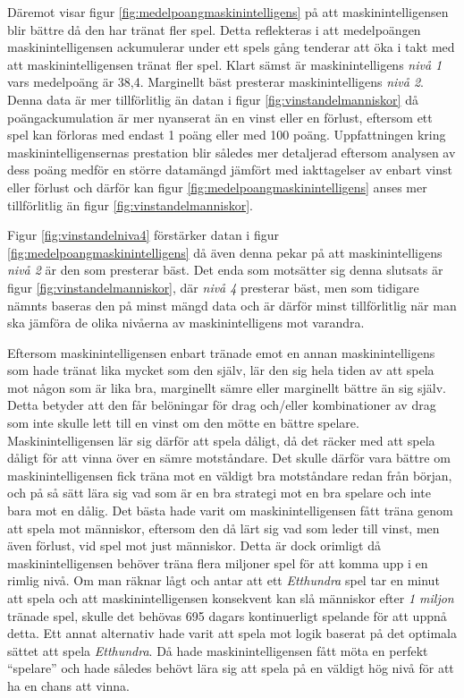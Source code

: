 \documentclass[12pt,a4paper]{article}
\begin{document}
    Däremot visar figur \ref{fig:medelpoangmaskinintelligens} på att maskinintelligensen blir bättre då den har tränat fler spel. Detta reflekteras i att medelpoängen maskinintelligensen ackumulerar under ett spels gång tenderar att öka i takt med att maskinintelligensen tränat fler spel. Klart sämst är maskinintelligens \emph{nivå 1} vars medelpoäng är 38,4. Marginellt bäst presterar maskinintelligens \emph{nivå 2}. Denna data är mer tillförlitlig än datan i figur \ref{fig:vinstandelmanniskor} då poängackumulation är mer nyanserat än en vinst eller en förlust, eftersom  ett spel kan förloras med endast 1 poäng eller med 100 poäng. Uppfattningen kring maskinintelligensernas prestation blir således mer detaljerad eftersom analysen av dess poäng medför en större datamängd jämfört med iakttagelser av enbart vinst eller förlust och därför kan figur \ref{fig:medelpoangmaskinintelligens} anses mer tillförlitlig än figur \ref{fig:vinstandelmanniskor}. 

    Figur \ref{fig:vinstandelniva4} förstärker datan i figur \ref{fig:medelpoangmaskinintelligens} då även denna pekar på att maskinintelligens \emph{nivå 2} är den som presterar bäst. Det enda som motsätter sig denna slutsats är figur \ref{fig:vinstandelmanniskor}, där \emph{nivå 4} presterar bäst, men som tidigare nämnts baseras den på minst mängd data och är därför minst tillförlitlig när man ska jämföra de olika nivåerna av maskinintelligens mot varandra. 

    Eftersom maskinintelligensen enbart tränade emot en annan maskinintelligens som hade tränat lika mycket som den själv, lär den sig hela tiden av att spela mot någon som är lika bra, marginellt sämre eller marginellt bättre än sig själv. Detta betyder att den får belöningar för drag och/eller kombinationer av drag som inte skulle lett till en vinst om den mötte en bättre spelare. Maskinintelligensen lär sig därför att spela dåligt, då det räcker med att spela dåligt för att vinna över en sämre motståndare. Det skulle därför vara bättre om maskinintelligensen fick träna mot en väldigt bra motståndare redan från början, och på så sätt lära sig vad som är en bra strategi mot en bra spelare och inte bara mot en dålig. Det bästa hade varit om maskinintelligensen fått träna genom att spela mot människor, eftersom den då lärt sig vad som leder till vinst, men även förlust, vid spel mot just människor. Detta är dock orimligt då maskinintelligensen behöver träna flera miljoner spel för att komma upp i en rimlig nivå. Om man räknar lågt och antar att ett \emph{Etthundra} spel tar en minut att spela och att maskinintelligensen konsekvent kan slå människor efter \emph{1 miljon} tränade spel, skulle det behövas 695 dagars kontinuerligt spelande för att uppnå detta. Ett annat alternativ hade varit att spela mot logik baserat på det optimala sättet att spela \emph{Etthundra}. Då hade maskinintelligensen fått möta en perfekt “spelare” och hade således behövt lära sig att spela på en väldigt hög nivå för att ha en chans att vinna.
\end{document}
